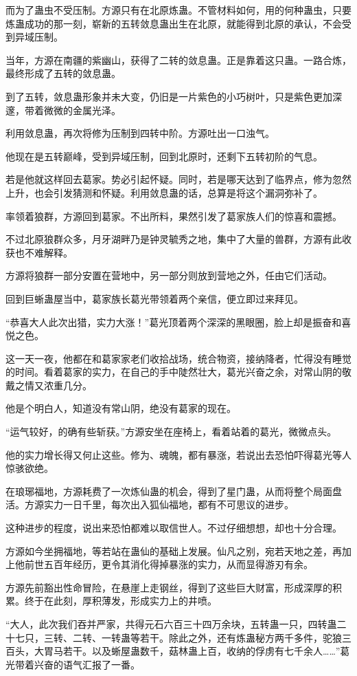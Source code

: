 \begin{this_body}
而为了蛊虫不受压制。方源只有在北原炼蛊。不管材料如何，用的何种蛊虫，只要炼蛊成功的那一刻，崭新的五转敛息蛊出生在北原，就能得到北原的承认，不会受到异域压制。

当年，方源在南疆的紫幽山，获得了二转的敛息蛊。正是靠着这只蛊。一路合炼，最终形成了五转的敛息蛊。

到了五转，敛息蛊形象并未大变，仍旧是一片紫色的小巧树叶，只是紫色更加深邃，带着微微的金属光泽。

利用敛息蛊，再次将修为压制到四转中阶。方源吐出一口浊气。

他现在是五转巅峰，受到异域压制，回到北原时，还剩下五转初阶的气息。

若是他就这样回去葛家。势必引起怀疑。同时，若是哪天达到了临界点，修为忽然上升，也会引发猜测和怀疑。利用敛息蛊的话，总算是将这个漏洞弥补了。

率领着狼群，方源回到葛家。不出所料，果然引发了葛家族人们的惊喜和震撼。

不过北原狼群众多，月牙湖畔乃是钟灵毓秀之地，集中了大量的兽群，方源有此收获也不难解释。

方源将狼群一部分安置在营地中，另一部分则放到营地之外，任由它们活动。

回到巨蜥蛊屋当中，葛家族长葛光带领着两个亲信，便立即过来拜见。

“恭喜大人此次出猎，实力大涨！”葛光顶着两个深深的黑眼圈，脸上却是振奋和喜悦之色。

这一天一夜，他都在和葛家家老们收拾战场，统合物资，接纳降者，忙得没有睡觉的时间。看着葛家的实力，在自己的手中陡然壮大，葛光兴奋之余，对常山阴的敬戴之情又浓重几分。

他是个明白人，知道没有常山阴，绝没有葛家的现在。

“运气较好，的确有些斩获。”方源安坐在座椅上，看着站着的葛光，微微点头。

他的实力增长得又何止这些。修为、魂魄，都有暴涨，若说出去恐怕吓得葛光等人惊骇欲绝。

在琅琊福地，方源耗费了一次炼仙蛊的机会，得到了星门蛊，从而将整个局面盘活。方源实力一日千里，每次出入狐仙福地，都有不可思议的进步。

这种进步的程度，说出来恐怕都难以取信世人。不过仔细想想，却也十分合理。

方源如今坐拥福地，等若站在蛊仙的基础上发展。仙凡之别，宛若天地之差，再加上他前世五百年经历，更令其消化得掉暴涨的实力，从而显得游刃有余。

方源先前豁出性命冒险，在悬崖上走钢丝，得到了这些巨大财富，形成深厚的积累。终于在此刻，厚积薄发，形成实力上的井喷。

“大人，此次我们吞并严家，共得元石六百三十四万余块，五转蛊一只，四转蛊二十七只，三转、二转、一转蛊等若干。除此之外，还有炼蛊秘方两千多件，驼狼三百头，大胃马若干。以及蜥屋蛊数千，菇林蛊上百，收纳的俘虏有七千余人……”葛光带着兴奋的语气汇报了一番。


\end{this_body}
